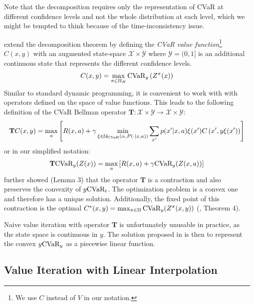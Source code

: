 Note that the decomposition requires only the representation of CVaR at different confidence levels and not the whole distribution at each level, which we might be tempted to think because of the time-inconsistency issue.

\citet{chow2015risk} extend the decomposition theorem by defining the \emph{CVaR value function}\footnote{We use $C$ instead of $V$ in our notation.} $C(x, y)$ with an augmented state-space $\mathcal{X}\times\mathcal{Y}$ where $\mathcal{Y}=(0,1]$ is an additional continuous state that represents the different confidence levels.
%
\begin{equation}
C(x, y)=\max_{\pi \in \Pi_H} \text{CVaR}_{y}\left( {Z^\pi(x)} \right)
\end{equation}
%
Similar to standard dynamic programming, it is convenient to work with with operators defined on the space of value functions. This leads to the following definition of the CVaR Bellman operator $\mathbf{T}:\mathcal{X}\times\mathcal{Y}\to\mathcal{X}\times\mathcal{Y}$:
%
\begin{equation}
\mathbf{T}C(x, y) = \max_a \left[ { R(x, a) + \gamma \min_{\xi \in \mathcal{U}_{\text{CVaR}}(\alpha, P(\cdot | x, a))} \sum_{x'} p(x'| x, a)\xi(x') C\left( {x', y\xi(x')} \right)} \right]
\end{equation}
%
or in our simplified notation:
%
\begin{equation}\label{eqn:tcvar}
\mathbf{T} \text{CVaR}_y(Z(x))=\max_a \left[ {R(x, a) + \gamma \text{CVaR}_{y}(Z(x, a))} \right]
\end{equation}
%
\citet{chow2015risk} further showed (Lemma 3) that the operator $\mathbf{T}$ is a contraction and also preserves the convexity of $y \text{CVaR}_t$. The optimization problem  is a convex one and therefore has a unique solution. Additionally, the fixed point of this contraction is the optimal $C^*(x, y) = \max_{\pi \in \Pi} \text{CVaR}_y (Z^\pi(x, y))$ (\citep{chow2015risk}, Theorem 4).
 
Naive value iteration with operator $\mathbf{T}$ is unfortunately unusable in practice, as the state space is continuous in $y$. The solution proposed in \cite{chow2015risk} is then to represent the convex $y\text{CVaR}_y$ as a piecewise linear function. 

\subsection{Value Iteration with Linear Interpolation}

